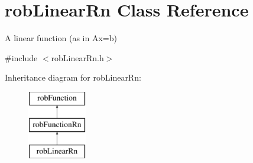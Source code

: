 \hypertarget{classrob_linear_rn}{}\section{rob\+Linear\+Rn Class Reference}
\label{classrob_linear_rn}


A linear function (as in Ax=b)  




{\ttfamily \#include $<$rob\+Linear\+Rn.\+h$>$}

Inheritance diagram for rob\+Linear\+Rn\+:\begin{figure}[H]
\begin{center}
\leavevmode
\includegraphics[height=3.000000cm]{da/d3b/classrob_linear_rn}
\end{center}
\end{figure}
